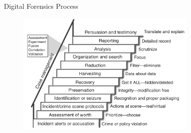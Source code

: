 \documentclass[handout]{beamer}
\begin{document}
\begin{frame}{Digital Forensics Process}

\begin{figure}
   \includegraphics[width=3.5in]{figures/digital-forensics-process.png}
\end{figure}

\end{frame}
\end{document}
